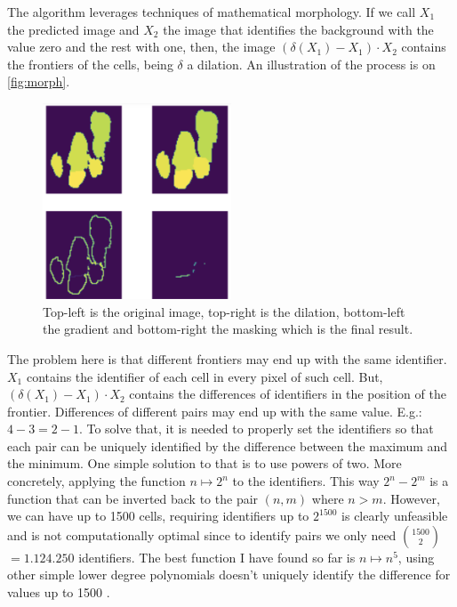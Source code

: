 The algorithm leverages techniques of mathematical morphology. If we call $X_1$ the predicted image and $X_2$ the image that identifies the background with the value zero and the rest with one, then, the image $(\delta (X_1) - X_1)  \cdot X_2$ contains the frontiers of the cells, being $\delta$ a dilation. An illustration of the process is on \autoref{fig:morph}.

\begin{figure}[ht]
    \centering
    \includegraphics[width=0.5\textwidth]{imgs/morphInflam.png}
    \caption{Top-left is the original image, top-right is the dilation, bottom-left the gradient and bottom-right the masking which is the final result.}
    \label{fig:morph}
\end{figure}

The problem here is that different frontiers may end up with the same identifier. $X_1$ contains the identifier of each cell in every pixel of such cell. But, $(\delta (X_1) - X_1)  \cdot X_2$ contains the differences of identifiers in the position of the frontier. Differences of different pairs may end up with the same value. E.g.: $4-3 = 2-1$. To solve that, it is needed to properly set the identifiers so that each pair can be uniquely identified by the difference between the maximum and the minimum. One simple solution to that is to use powers of two. More concretely, applying the function $n \mapsto 2^n$ to the identifiers. This way $2^n-2^m$ is a function that can be inverted back to the pair $(n,m)$ where $n>m$. However, we can have up to 1500 cells, requiring identifiers up to $2^{1500}$ is clearly unfeasible and is not computationally optimal since to identify pairs we only need $1500 \choose 2$ $=1.124.250$ identifiers. The best function I have found so far is $n \mapsto n^5$, using other simple lower degree polynomials doesn't uniquely identify the difference for values up to 1500 \cite{4567383}.

